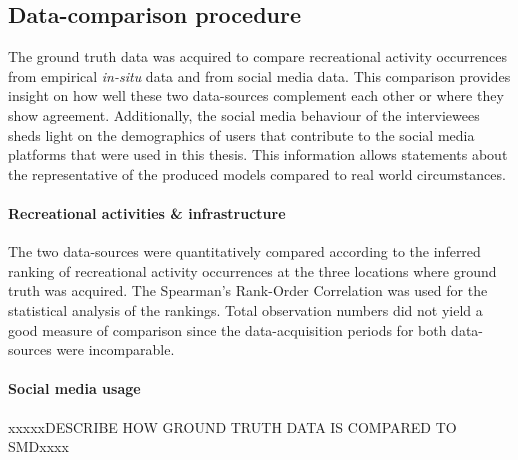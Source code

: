 \subsection{Data-comparison procedure}
The ground truth data was acquired to compare recreational activity occurrences from empirical \textit{in-situ} data and from social media data. This comparison provides insight on how well these two data-sources complement each other or where they show agreement. Additionally, the social media behaviour of the interviewees sheds light on the demographics of users that contribute to the social media platforms that were used in this thesis. This information allows statements about the representative of the produced models compared to real world circumstances.

\paragraph*{Recreational activities \& infrastructure}
The two data-sources were quantitatively compared according to the inferred ranking of recreational activity occurrences at the three locations where ground truth was acquired. The Spearman's Rank-Order Correlation was used for the statistical analysis of the rankings. Total observation numbers did not yield a good measure of comparison since the data-acquisition periods for both data-sources were incomparable. 



\paragraph*{Social media usage}


xxxxxDESCRIBE HOW GROUND TRUTH DATA IS COMPARED TO SMDxxxx
















